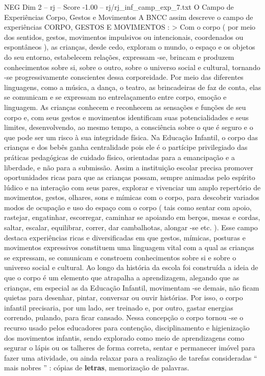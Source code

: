 \begin{textsample}{NEG Dim 2 – rj – Score -1.00 – rj/rj\_inf\_camp\_exp\_7.txt}  \label{ex:f2_neg_055}
O Campo de Experiências Corpo, Gestos e Movimentos A BNCC assim descreve o campo de experiências CORPO, GESTOS E MOVIMENTOS : > Com o corpo ( por meio dos sentidos, gestos, movimentos impulsivos ou intencionais, coordenados ou espontâneos ), as crianças, desde cedo, exploram o mundo, o espaço e os objetos do seu entorno, estabelecem relações, expressam -se, brincam e produzem conhecimentos sobre si, sobre o outro, sobre o universo social e cultural, tornando -se progressivamente conscientes dessa corporeidade.
Por meio das diferentes linguagens, como a música, a dança, o teatro, as brincadeiras de faz de conta, elas se comunicam e se expressam no entrelaçamento entre corpo, emoção e linguagem.
As crianças conhecem e reconhecem as sensações e funções de seu corpo e, com seus gestos e movimentos identificam suas potencialidades e seus limites, desenvolvendo, ao mesmo tempo, a consciência sobre o que é seguro e o que pode ser um risco à sua integridade física.
Na Educação Infantil, o corpo das crianças e dos bebês ganha centralidade pois ele é o partícipe privilegiado das práticas pedagógicas de cuidado físico, orientadas para a emancipação e a liberdade, e não para a submissão.
Assim a instituição escolar precisa promover oportunidades ricas para que as crianças possam, sempre animadas pelo espírito lúdico e na interação com seus pares, explorar e vivenciar um amplo repertório de movimentos, gestos, olhares, sons e mímicas com o corpo, para descobrir variados modos de ocupação e uso do espaço com o corpo ( tais como sentar com apoio, rastejar, engatinhar, escorregar, caminhar se apoiando em berços, mesas e cordas, saltar, escalar, equilibrar, correr, dar cambalhotas, alongar -se etc. ).
Esse campo destaca experiências ricas e diversificadas em que gestos, mímicas, posturas e movimentos expressivos constituem uma linguagem vital com a qual as crianças se expressam, se comunicam e constroem conhecimentos sobre si e sobre o universo social e cultural.
Ao longo da história da escola foi construída a ideia de que o corpo é um elemento que atrapalha a aprendizagem, alegando que as crianças, em especial as da Educação Infantil, movimentam -se demais, não ficam quietas para desenhar, pintar, conversar ou ouvir histórias.
Por isso, o corpo infantil precisaria, por um lado, ser treinado e, por outro, gastar energias correndo, pulando, para ficar cansado.
Nessa concepção o corpo tornou -se o recurso usado pelos educadores para contenção, disciplinamento e higienização dos movimentos infantis, sendo explorado como meio de aprendizagens como segurar o lápis ou os talheres de forma correta, sentar e permanecer imóvel para fazer uma atividade, ou ainda relaxar para a realização de tarefas consideradas “ mais nobres ” : cópias de \textbf{letras}, memorização de palavras.

\end{textsample}
